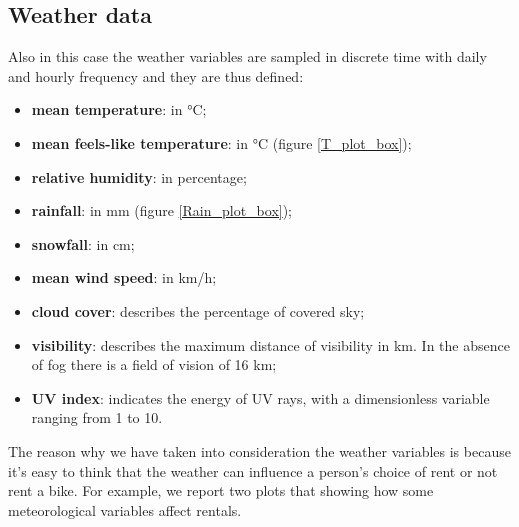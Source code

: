 \subsection{Weather data}
Also in this case the weather variables are sampled in discrete time with daily and hourly frequency and they are thus defined:
\begin{itemize}
	\item \textbf{mean temperature}: in \unit{\degreeCelsius};
	\item \textbf{mean feels-like temperature}: in \unit{\degreeCelsius} (figure \ref{T_plot_box});
	\item \textbf{relative humidity}: in percentage;
	\item \textbf{rainfall}: in \unit{\milli\meter} (figure \ref{Rain_plot_box});
	\item \textbf{snowfall}: in \unit{\centi\meter};
	\item \textbf{mean wind speed}: in \unit{\kilo\meter/\hour};
	\item \textbf{cloud cover}: describes the percentage of covered sky;
	\item \textbf{visibility}: describes the maximum distance of visibility in \unit{\kilo\meter}. In the absence of fog there is a field of vision of \num{16} km;
	\item \textbf{UV index}: indicates the energy of UV rays, with a dimensionless variable ranging from \num{1} to \num{10}.
\end{itemize}
The reason why we have taken into consideration the weather variables is because it's easy to think that the weather can influence a person's choice of rent or not rent a bike. For example, we report two plots that showing how some meteorological variables affect rentals.
\\
\\
\\
